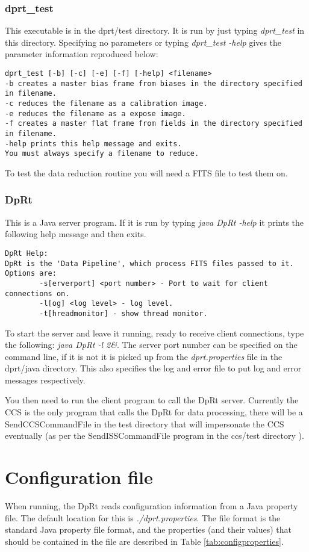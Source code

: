 \documentclass[10pt,a4paper]{article}
\begin{document}
\subsubsection{dprt\_test}
This executable is in the dprt/test directory. It is run by just typing {\em dprt\_test} in this directory.
Specifying no parameters or typing {\em dprt\_test -help} gives the parameter information reproduced below:
\begin{verbatim}
dprt_test [-b] [-c] [-e] [-f] [-help] <filename>
-b creates a master bias frame from biases in the directory specified in filename.
-c reduces the filename as a calibration image.
-e reduces the filename as a expose image.
-f creates a master flat frame from fields in the directory specified in filename.
-help prints this help message and exits.
You must always specify a filename to reduce.
\end{verbatim}
To test the data reduction routine you will need a FITS file to test them on.

\subsubsection{DpRt}
This is a Java server program. If it is run by typing {\em java DpRt -help} it prints the following help message
and then exits.
\begin{verbatim}
DpRt Help:
DpRt is the 'Data Pipeline', which process FITS files passed to it.
Options are:
        -s[erverport] <port number> - Port to wait for client connections on.
        -l[og] <log level> - log level.
        -t[hreadmonitor] - show thread monitor.
\end{verbatim}

To start the server and leave it running, ready to receive client connections, type the following:
{\em java DpRt -l 2\&}. The server port number can be specified on the command line, if it is not it is
picked up from the {\em dprt.properties} file in the dprt/java directory. This also specifies the log and
error file to put log and error messages respectively.

You then need to run the client program to call the DpRt server. Currently the CCS is the only program that
calls the DpRt for data processing, there will be a SendCCSCommandFile in the test directory that will
impersonate the CCS eventually (as per the SendISSCommandFile program in the ccs/test directory \cite{bib:ccs}).

\section{Configuration file}
When running, the DpRt reads configuration information from a Java property file. The default location for
this is {\em ./dprt.properties}. The file format is the standard Java property file format, and
the properties (and their values) that should be contained in the file are described in 
Table \ref{tab:configproperties}.
\end{document}
